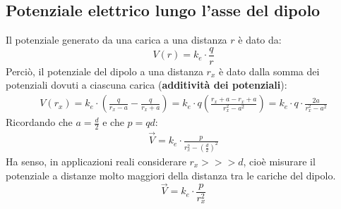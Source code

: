 \subsection{Potenziale elettrico lungo l'asse del dipolo}
Il potenziale generato da una carica a una distanza $r$ è dato da:
\begin{displaymath}
	V(r) = k_e \cdot \frac{q}{r}
\end{displaymath}
Perciò, il potenziale del dipolo a una distanza $r_x$ è dato dalla somma dei potenziali dovuti a ciascuna carica (\textbf{additività dei potenziali}):
\begin{displaymath}\begin{aligned}
	V(r_x) = k_e \cdot \left( \frac{q}{r_x-a} - \frac{q}{r_x+a} \right) =
    k_e \cdot q \left( \frac{r_x + a - r_x + a}{r_x^2 -a^2} \right)=
    k_e \cdot q \cdot \frac{2a}{r_x^2-a^2}
\end{aligned}\end{displaymath}
Ricordando che $a = \frac{d}{2}$ e che $p = qd$:
\begin{displaymath}\begin{aligned}
	\vec{V} = k_e \cdot \frac{p}{r_x^2 - (\frac{d}{2})^2}    
\end{aligned}\end{displaymath}
Ha senso, in applicazioni reali considerare $r_x >>> d$, cioè misurare il potenziale a distanze molto maggiori della distanza tra le cariche del dipolo.
\begin{displaymath}
	\vec{V} = k_e \cdot \frac{p}{r_x^2}
\end{displaymath}
